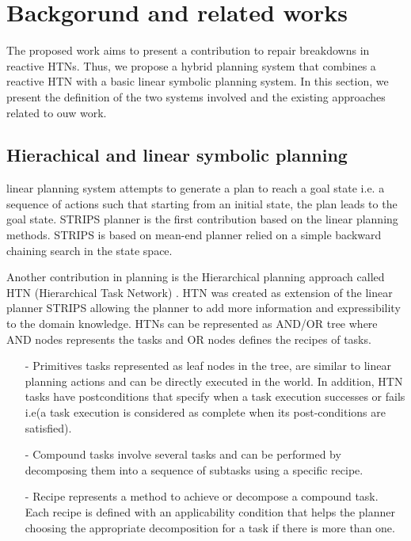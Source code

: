 \documentclass[conference]{IEEEtran}
\begin{document}
	\section{Backgorund and related works}
	The proposed work aims to present a contribution to repair breakdowns in reactive HTNs. Thus, we propose a hybrid planning system that combines a reactive HTN with a basic linear symbolic planning system. In this section, we present the definition of the two systems involved  and the existing approaches related to ouw work. 
	\subsection{Hierachical and linear symbolic planning}
	linear planning system attempts to generate a plan to reach a goal state i.e. a sequence of actions such that starting from an initial state, the plan leads to the goal state.  STRIPS planner \cite{fikes1972strips} is the first contribution based on the linear planning methods. STRIPS is based on  mean-end planner relied on a simple backward chaining search in the state space.
	\par Another contribution in planning is the Hierarchical planning approach called HTN (Hierarchical Task Network)  \cite{erol1996hierarchical}. HTN was created as extension of the linear planner STRIPS  allowing the planner to add more information and expressibility to the domain knowledge. 
	HTNs can be represented as AND/OR tree where AND nodes represents the tasks and OR nodes defines the recipes of tasks. 
	\begin{itemize}
		\item[-] Primitives tasks represented as leaf nodes in the tree, are similar to linear planning actions  and can be directly executed in the world. In addition, HTN tasks have postconditions that specify when a task execution successes or fails i.e(a task execution is considered as complete when its post-conditions are satisfied).
		
		\item[-] Compound tasks involve several tasks and can be performed by decomposing them into a sequence of subtasks using a specific recipe. 
		
		\item[-] Recipe represents  a method to achieve or decompose a compound task. Each recipe is defined with an applicability condition that helps the planner choosing the appropriate decomposition for a task if there is more than  one.
		
	\end{itemize}
\end{document}

